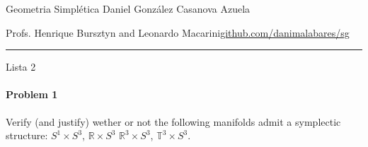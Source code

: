 

\usepackage[style=authortitle-terse,backend=bibtex]{biblatex}




\begin{minipage}{\textwidth}
	\begin{minipage}{1\textwidth}
		Geometria Simpl\'etica \hfill Daniel González Casanova Azuela
		
		{\small Profs. Henrique Bursztyn and Leonardo Macarini\hfill\href{https://github.com/danimalabares/sg}{github.com/danimalabares/sg}}
	\end{minipage}
\end{minipage}\vspace{.2cm}\hrule

\vspace{10pt}
{\huge Lista 2}

\paragraph{Problem 1} Verify (and justify) wether or not the following manifolds admit a symplectic structure: $S^{1}\times S^3$, $\mathbb{R}\times S^3$ $\mathbb{R}^{3}\times S^{3}$, $\mathbb{T}^3\times S^3$.


